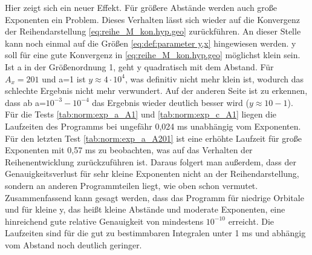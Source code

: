  Hier zeigt sich ein neuer Effekt. Für größere Abstände werden auch große 
 Exponenten ein Problem. Dieses Verhalten lässt sich wieder auf die Konvergenz 
 der 
 Reihendarstellung \ref{eq:reihe_M_kon.hyp.geo} zurückführen. An dieser 
 Stelle kann noch einmal auf die Größen \ref{eq:def:parameter y,x} hingewiesen 
 werden. y soll für eine gute Konvergenz in \ref{eq:reihe_M_kon.hyp.geo} 
 möglichst klein sein.  Ist a in der Größenordnung 1, geht y quadratisch mit 
 dem 
 Abstand. Für $A_x=201$ und a=1 ist $y\approx4\cdot10^4$, was definitiv nicht 
 mehr klein ist, wodurch das schlechte Ergebnis nicht mehr verwundert. Auf der 
 anderen Seite ist zu erkennen, dass ab a=$10^{-3}-10^{-4}$ das Ergebnis wieder 
 deutlich besser wird ($y\approx10-1$).\\
 
 Für die Tests \ref{tab:norm:exp_a_A1} und \ref{tab:norm:exp_c_A1} liegen die 
 Laufzeiten des Programms bei ungefähr 0,024 ms unabhängig vom Exponenten. Für 
 den letzten Test \ref{tab:norm:exp_a_A201} ist eine erhöhte Laufzeit für große 
 Exponenten mit 0,57 ms zu beobachten, was auf das Verhalten der 
 Reihenentwicklung zurückzuführen ist. Daraus folgert man außerdem, dass der 
 Genauigkeitsverlust für sehr kleine Exponenten nicht an der Reihendarstellung, 
 sondern an anderen Programmteilen liegt, wie oben schon vermutet.\\%
 
 Zusammenfassend kann gesagt werden, dass das Programm für niedrige Orbitale 
 und für kleine y, das heißt kleine Abstände und moderate Exponenten, eine 
 hinreichend gute relative Genauigkeit von mindestens $10^{-10}$ erreicht. Die 
 Laufzeiten sind für die gut zu bestimmbaren Integralen unter 1 ms und abhängig 
 vom Abstand noch deutlich geringer. 
%
%
%

